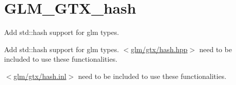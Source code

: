 \hypertarget{group__gtx__hash}{\section{G\-L\-M\-\_\-\-G\-T\-X\-\_\-hash}
\label{group__gtx__hash}
}


Add std\-::hash support for glm types.  


Add std\-::hash support for glm types. $<$\hyperlink{hash_8hpp}{glm/gtx/hash.\-hpp}$>$ need to be included to use these functionalities.

$<$\hyperlink{hash_8inl}{glm/gtx/hash.\-inl}$>$ need to be included to use these functionalities. 